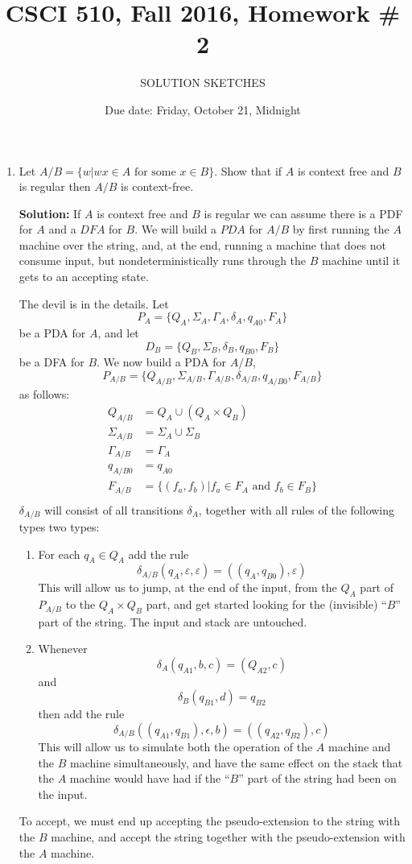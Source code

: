 \documentclass{article}
\title{CSCI 510, Fall 2016, Homework \# 2}
\author{SOLUTION SKETCHES}
\date{Due date: Friday, October 21, Midnight}
\begin{document}
\maketitle
\begin{enumerate}
\item Let $A/B=\{w| \mbox{$wx\in A$ for some $x\in B$}\}$.  Show that
  if $A$ is context free and $B$ is regular then $A/B$ is context-free.

  {\bf Solution:}
  If $A$ is context free and $B$ is regular we can assume there is a
  PDF for $A$ and a $DFA$ for $B$.  We will build a $PDA$ for $A/B$ by
  first running the $A$ machine over the string, and, at the end,
  running  a machine that does not consume input, but
  nondeterministically runs through the $B$ machine until it gets to
  an accepting state.

  The devil is in the details.
  Let
  \[
  P_A = \{Q_A, \Sigma_A, \Gamma_A, \delta_A, q_{A0}, F_A\}
  \]
  be a PDA for $A$, and let
  \[
  D_B = \{Q_B, \Sigma_B, \delta_B, q_{B0}, F_B\}
  \]
  be a DFA for $B$.  We now build a PDA for $A/B$,
  \[
  P_{A/B} = \{Q_{A/B}, \Sigma_{A/B}, \Gamma_{A/B}, \delta_{A/B}, q_{A/B0}, F_{A/B}\}
  \]
  as follows:
  \begin{align*}
    Q_{A/B} &= Q_A \cup  ( Q_A\times Q_B )\\
    \Sigma_{A/B} &=     \Sigma_{A} \cup    \Sigma_{B} \\
    \Gamma_{A/B} &= \Gamma_A\\
    q_{A/B0} &= q_{A0} \\
    F_{A/B} &= \{(f_a,f_b) | f_a\in F_A \mbox{ and } f_b \in F_B\}\\
  \end{align*}
  $\delta_{A/B}$ will consist of all transitions  $\delta_A$, together
  with all rules of the following types two types:
  \begin{enumerate}
    \item For each $q_A \in Q_A$ add
      the rule
      \[
      \delta_{A/B}(q_A,\varepsilon,\varepsilon) = ((q_A,q_{B0}),
      \varepsilon)
      \]
      This will allow us to jump, at the end of the input, from the
      $Q_A$ part of $P_{A/B}$ to the $Q_A\times Q_B$ part, and get
      started looking for the (invisible) ``$B$'' part of the string.
      The input and stack are untouched.

    \item
      Whenever
      \[
      \delta_A(q_{A1}, b, c) = (Q_{A2}, c)
      \]
      and
      \[
      \delta_B(q_{B1}, d) = q_{B2}
      \]
      then add the rule
      \[
      \delta_{A/B}((q_{A1},q_{B1}), \epsilon, b) = ((q_{A2},q_{B2}),
      c)
      \]
      This will allow us to simulate both the operation of the $A$
      machine and the $B$ machine simultaneously, and have the same
      effect on the stack that the $A$ machine would have had if the
      ``$B$'' part of the string had been on the input.
  \end{enumerate}
  To accept, we must end up accepting the pseudo-extension to the
  string with the $B$ machine, and accept the string together with the
  pseudo-extension with the $A$ machine.
  

\end{enumerate}
\end{document}
